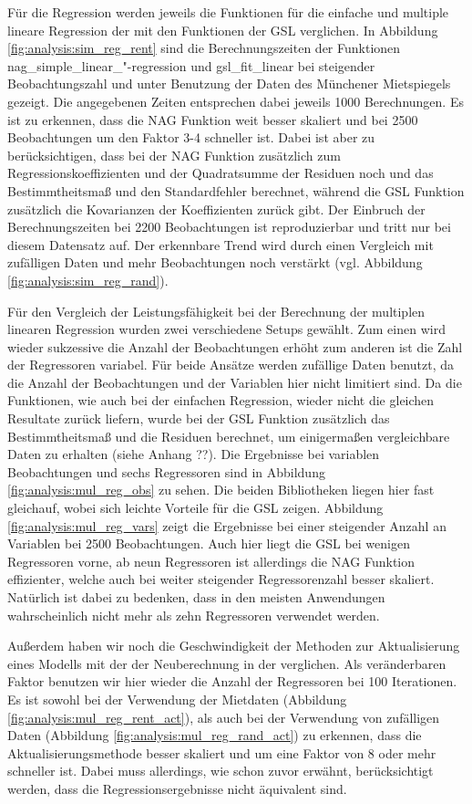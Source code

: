 Für die Regression werden jeweils die Funktionen für die einfache und multiple lineare Regression der \naglib mit den Funktionen der GSL verglichen.
In Abbildung \ref{fig:analysis:sim_reg_rent} sind die Berechnungszeiten der Funktionen nag\_simple\_linear\_"-regression und gsl\_fit\_linear bei steigender Beobachtungszahl und unter Benutzung der Daten des Münchener Mietspiegels gezeigt.
Die angegebenen Zeiten entsprechen dabei jeweils 1000 Berechnungen.
Es ist zu erkennen, dass die NAG Funktion weit besser skaliert und bei 2500 Beobachtungen um den Faktor 3-4 schneller ist.
Dabei ist aber zu berücksichtigen, dass bei der NAG Funktion zusätzlich zum Regressionskoeffizienten und der Quadratsumme der Residuen noch und das Bestimmtheitsmaß und den Standardfehler berechnet, während die GSL Funktion zusätzlich die Kovarianzen der Koeffizienten zurück gibt.
Der Einbruch der Berechnungszeiten bei 2200 Beobachtungen ist reproduzierbar und tritt nur bei diesem Datensatz auf.
Der erkennbare Trend wird durch einen Vergleich mit zufälligen Daten und mehr Beobachtungen noch verstärkt (vgl. Abbildung \ref{fig:analysis:sim_reg_rand}).

Für den Vergleich der Leistungsfähigkeit bei der Berechnung der multiplen linearen Regression wurden zwei verschiedene Setups gewählt.
Zum einen wird wieder sukzessive die Anzahl der Beobachtungen erhöht zum anderen ist die Zahl der Regressoren variabel. 
Für beide Ansätze werden zufällige Daten benutzt, da die Anzahl der Beobachtungen und der Variablen hier nicht limitiert sind.
Da die Funktionen, wie auch bei der einfachen Regression, wieder nicht die gleichen Resultate zurück liefern, wurde bei der GSL Funktion zusätzlich das Bestimmtheitsmaß und die Residuen berechnet, um einigermaßen vergleichbare Daten zu erhalten (siehe Anhang ??).
Die Ergebnisse bei variablen Beobachtungen und sechs Regressoren sind in Abbildung \ref{fig:analysis:mul_reg_obs} zu sehen.
Die beiden Bibliotheken liegen hier fast gleichauf, wobei sich leichte Vorteile für die GSL zeigen.
Abbildung \ref{fig:analysis:mul_reg_vars} zeigt die Ergebnisse bei einer steigender Anzahl an Variablen bei 2500 Beobachtungen.
Auch hier liegt die GSL bei wenigen Regressoren vorne, ab neun Regressoren ist allerdings die NAG Funktion effizienter, welche auch bei weiter steigender Regressorenzahl besser skaliert.
Natürlich ist dabei zu bedenken, dass in den meisten Anwendungen wahrscheinlich nicht mehr als zehn Regressoren verwendet werden.

Außerdem haben wir noch die Geschwindigkeit der Methoden zur Aktualisierung eines Modells mit der der Neuberechnung in der \naglib verglichen.
Als veränderbaren Faktor benutzen wir hier wieder die Anzahl der Regressoren bei 100 Iterationen.
Es ist sowohl bei der Verwendung der Mietdaten (Abbildung \ref{fig:analysis:mul_reg_rent_act}), als auch bei der Verwendung von zufälligen Daten (Abbildung \ref{fig:analysis:mul_reg_rand_act}) zu erkennen, dass die Aktualisierungsmethode besser skaliert und um eine Faktor von 8 oder mehr schneller ist.
Dabei muss allerdings, wie schon zuvor erwähnt, berücksichtigt werden, dass die Regressionsergebnisse nicht äquivalent sind.


